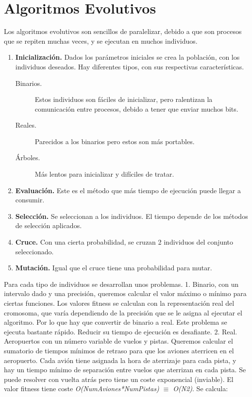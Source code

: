 	


\section{Algoritmos Evolutivos}
	Los algoritmos evolutivos son sencillos de paralelizar, debido a que son procesos que se repiten muchas veces, y se ejecutan en muchos individuos.
	
	\begin{enumerate}
		\item \textbf{Inicialización.} Dados los parámetros iniciales se crea la población, con los individuos deseados. Hay diferentes tipos, con sus respectivas características.
		\begin{description}
			\item[Binarios.] Estos individuos son fáciles de inicializar, pero ralentizan la comunicación entre procesos, debido a tener que enviar muchos bits.
			\item[Reales.] Parecidos a los binarios pero estos son más portables.
			\item[Árboles.] Más lentos para inicializar y difíciles de tratar.
		\end{description}
		
		\item \textbf{Evaluación.} Este es el método que más tiempo de ejecución puede llegar a consumir.
		
		\item \textbf{Selección.} Se seleccionan a los individuos. El tiempo depende de los métodos de selección aplicados.
		
		\item \textbf{Cruce.} Con una cierta probabilidad, se cruzan 2 individuos del conjunto seleccionado.
		
		\item \textbf{Mutación.} Igual que el cruce tiene una probabilidad para mutar.
	\end{enumerate}
	
	Para cada tipo de individuos se desarrollan unos problemas.
	1. Binario, con un intervalo dado y una precisión, queremos calcular el valor máximo o mínimo para ciertas funciones. Los valores fitness se calculan con la representación real del cromosoma, que varía dependiendo de la precisión que se le asigna al ejecutar el algoritmo. Por lo que hay que convertir de binario a real.
	Este problema se ejecuta bastante rápido. Reducir su tiempo de ejecución es desafiante.
	2. Real. Aeropuertos con un número variable de vuelos y pistas. Queremos calcular el sumatorio de tiempos mínimos de retraso para que los aviones aterricen en el aeropuerto. Cada avión tiene asignada la hora de aterrizaje para cada pista, y hay un tiempo mínimo de separación entre vuelos que aterrizan en cada pista. Se puede resolver con vuelta atrás pero tiene un coste exponencial (inviable). El valor fitness tiene coste \textit{O(NumAviones*NumPistas) $\equiv$ O(N2)}. Se calcula:
	
